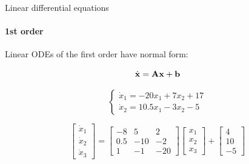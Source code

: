 \documentclass{beamer}
\begin{document}
\begin{frame}{Linear differential equations}
\framesubtitle{1st order}
\begin{flushleft}

Linear ODEs of the first order have normal form:

\begin{equation}
    \dot{\mathbf{x}} = \mathbf{A} \mathbf{x} + \mathbf{b}
\end{equation}

\begin{example}
\begin{equation}
\begin{cases}
    \dot{x}_1 = -20 x_1 + 7 x_2 + 17 \\
    \dot{x}_2 = 10.5 x_1 - 3 x_2 - 5
\end{cases}
\end{equation}
\end{example}

\begin{example}
\begin{equation}
\begin{bmatrix}
\dot{x}_1 \\
\dot{x}_2 \\
\dot{x}_3
\end{bmatrix} 
= 
\begin{bmatrix}
-8   & 5   & 2  \\
 0.5 & -10 & -2 \\
 1   & -1 & -20
\end{bmatrix}
\begin{bmatrix}
x_1 \\
x_2 \\
x_3
\end{bmatrix} 
+
\begin{bmatrix}
4  \\
10 \\
-5
\end{bmatrix} 
\end{equation}
\end{example}

\end{flushleft}
\end{frame}
\end{document}
